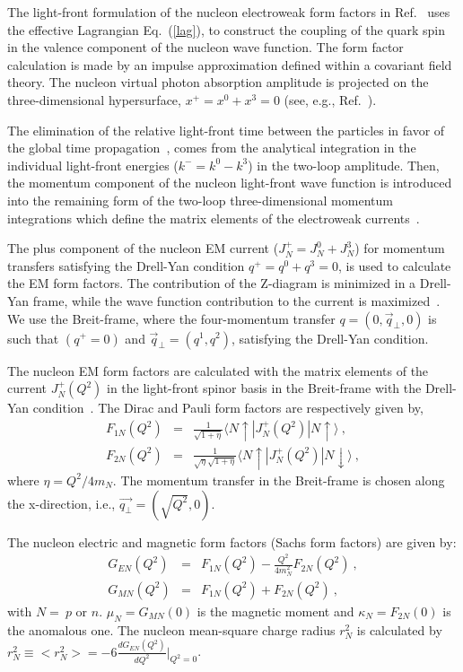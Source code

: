 \documentclass[preprint,aps,showpacs,floatfix]{revtex4}
\begin{document}
The light-front formulation of the nucleon electroweak form
factors in Ref.~\cite{afsbw} uses the effective Lagrangian 
Eq.~(\ref{lag}), to construct the coupling of the quark spin in the
valence component of the nucleon wave function. The form factor
calculation is made by an impulse approximation defined within
a covariant field theory. The nucleon virtual photon absorption
amplitude is projected on the three-dimensional hypersurface,
$x^+=x^0+x^3=0$ (see, e.g., Ref.~\cite{karmanov}). 


The elimination of the relative light-front time between the particles
in favor of the global time propagation~\cite{sales00,tob92,Ji:1998hx}, 
comes from the analytical integration in the individual light-front energies
($k^-=k^0-k^3$) in the two-loop amplitude.  Then, the momentum
component of the nucleon light-front wave function is introduced
into the remaining form of the two-loop three-dimensional momentum
integrations which define the matrix elements of the electroweak
currents~\cite{afsbw,tob92,pach99}.

The plus component of the nucleon EM current ($J^+_N=J_N^0+J_N^3$)
for momentum transfers satisfying the Drell-Yan condition
$q^+=q^0+q^3=0$, is used to calculate the EM form
factors. The contribution of the Z-diagram is minimized in a
Drell-Yan frame, while the wave function contribution to the current is 
maximized~\cite{karmanov,tob92,pach99,brodsky,ji00}. 
We use the Breit-frame, where the four-momentum transfer $q=(0,\vec
q_\perp,0)$ is such that $(q^+=0)$ and $\vec q_\perp=(q^1,q^2)$,
satisfying the Drell-Yan condition.

The nucleon EM form factors are calculated with the
matrix elements of the current $J^+_N(Q^2)$ in the light-front
spinor basis in the Breit-frame with the Drell-Yan condition~\cite{chung,afsbw}. 
The Dirac and Pauli form factors are respectively given by, 
\begin{eqnarray}
F_{1N}(Q^2)&=&\frac{1}{\sqrt{1+\eta}}\langle N \uparrow|J^+_N(Q^2)| N \uparrow\rangle
\ , \nonumber \\
F_{2N}(Q^2)&=&\frac{1}{\sqrt{\eta}\sqrt{1+\eta}}\langle N \uparrow|J^+_N(Q^2)| N \downarrow\rangle
\ , \label{jp}
\end{eqnarray}
where $\eta=Q^2/4m_N$. The momentum transfer in the Breit-frame
is chosen along the x-direction, i.e., $\vec{q_\perp} = (\sqrt{Q^2},0)$.

The nucleon electric and magnetic form factors (Sachs form
factors) are given by:
\begin{eqnarray}
G_{EN}(Q^2)&=& F_{1N}(Q^2)-\frac{Q^2}{4m_N^2}F_{2N}(Q^2) \ ,
\nonumber \\
G_{MN}(Q^2)&=& F_{1N}(Q^2)+F_{2N}(Q^2) \ ,
\end{eqnarray}
with $N = \ p$ or $n$. $\mu_N = G_{MN}(0)$ is the magnetic moment
and $\kappa_N=F_{2N}(0)$ is the anomalous one. 
The nucleon mean-square charge radius $r^2_N$ is calculated by 
$r^2_N \equiv <r^2_N> = -6\frac{dG_{EN}(Q^2)}{dQ^2}|_{Q^2=0}$.
\end{document}
